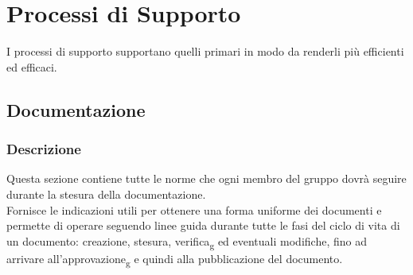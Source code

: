 \section{Processi di Supporto}
I processi di supporto supportano quelli primari in modo da renderli più efficienti ed efficaci.
    \subsection{Documentazione}
        \subsubsection{Descrizione}
        Questa sezione contiene tutte le norme che ogni membro del gruppo dovrà seguire durante 
        la stesura della documentazione.\\
        Fornisce le indicazioni utili per ottenere una forma uniforme dei documenti e permette di operare seguendo linee guida durante tutte le fasi del ciclo di vita di un documento: creazione, stesura, verifica\textsubscript{g} ed 
        eventuali modifiche, fino ad arrivare all'approvazione\textsubscript{g} e quindi alla pubblicazione del documento.
